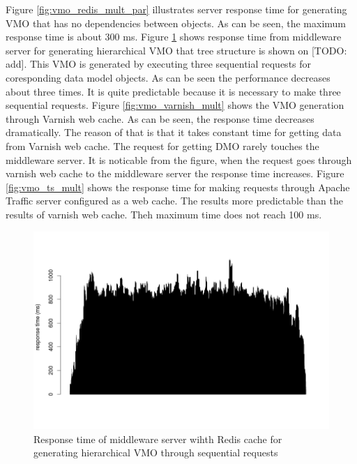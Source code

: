 Figure \ref{fig:vmo_redis_mult_par} illustrates server response time for generating VMO that has no dependencies between objects. As can be seen, the maximum response time is about 300 ms. Figure \ref{fig:vmo_redis_mult_seq} shows response time from middleware server for generating hierarchical VMO that tree structure is shown on [TODO: add]. This VMO is generated by executing three sequential requests for coresponding data model objects. As can be seen the performance decreases about three times. It is quite predictable because it is necessary to make three sequential requests. Figure \ref{fig:vmo_varnish_mult} shows the VMO generation through Varnish web cache. As can be seen, the response time decreases dramatically. The reason of that is that it takes constant time for getting data from Varnish web cache. The request for getting DMO rarely touches the middleware server. It is noticable from the figure, when the request goes through varnish web cache to the middleware server the response time increases. Figure \ref{fig:vmo_ts_mult} shows the response time for making requests through Apache Traffic server configured as a web cache. The results more predictable than the results of varnish web cache. Theh maximum time does not reach 100 ms.  


\begin{figure}[h]
    \centering
    \includegraphics[width=\textwidth]{images/vmo_redis_mult_seq.png}
    \caption{Response time of middleware server wihth Redis cache for generating hierarchical VMO through sequential requests}
    \label{fig:vmo_redis_mult_seq}
\end{figure}


